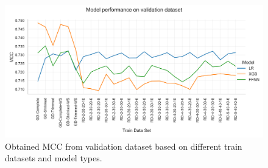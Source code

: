 \begin{figure}[ht]
	\centering
	\includegraphics[width =\textwidth]{pictures/feature_filter/validation_line_plot.png}
	\caption{Obtained MCC from validation dataset based on different train datasets and model types.}
	\label{fig:validation_performance_line_plot}
\end{figure}

